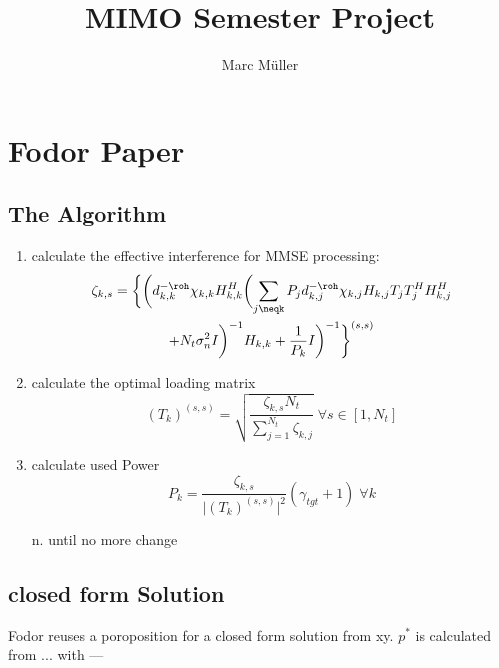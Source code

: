 \documentclass[9pt,draft]{report}
\begin{document}
\author{Marc Müller}
\title{MIMO Semester Project}

\chapter{Fodor Paper}

\section{The Algorithm}
\begin{enumerate}
	\item calculate the effective interference for MMSE processing:
		\begin{multline}
			\zeta_{k,s} = \biggl\{\biggl(d^{-\roh}_{k,k}\chi_{k,k}H^H_{k,k}\biggl(\sum_{j\neqk}{P_jd^{-\roh}_{k,j}\chi_{k,j}H_{k,j}T_jT_j^HH^H_{k,j}}\\
			+N_t\sigma^2_nI\biggr)^{-1}H_{k,k}+\frac{1}{P_k}I\biggr)^{-1}\biggr\}^{(s,s)}
		\end{multline}

	\item calculate the optimal loading matrix
		\begin{equation}
			(T_k)^{(s,s)} = \sqrt{\frac{\zeta_{k,s}N_t}{\sum_{j=1}^{N_t}\zeta_{k,j}}}\;\forall s\in[1,N_t]
		\end{equation}

	\item calculate used Power
		\begin{equation}
			P_k = \frac{\zeta_{k,s}}{\vert(T_k)^{(s,s)}\vert^2}(\gamma_{tgt}+1)\;\forall k
		\end{equation}

	\item[n.] until no more change

\end{enumerate}

\section{closed form Solution}
Fodor reuses a poroposition for a closed form solution from xy.
$p^*$ is calculated from ... with ---
\end{document}
